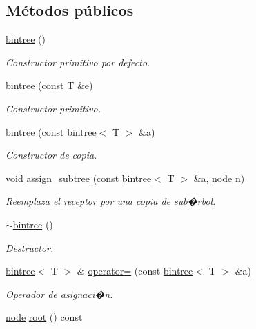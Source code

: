 \subsection*{Métodos públicos}
\begin{DoxyCompactItemize}
\item 
\hyperlink{classbintree_a9fed4a26a9c177dfa14a9cb573b43dca}{bintree} ()
\begin{DoxyCompactList}\small\item\em Constructor primitivo por defecto. \end{DoxyCompactList}\item 
\hyperlink{classbintree_a21aaa03b1510c5ffa52236d2a8973273}{bintree} (const T \&e)
\begin{DoxyCompactList}\small\item\em Constructor primitivo. \end{DoxyCompactList}\item 
\hyperlink{classbintree_a4658c6df869d8b35a72b6cbcf410bc5f}{bintree} (const \hyperlink{classbintree}{bintree}$<$ T $>$ \&a)
\begin{DoxyCompactList}\small\item\em Constructor de copia. \end{DoxyCompactList}\item 
void \hyperlink{classbintree_ab5fb2e54f418de017ba23a2b7084e67e}{assign\+\_\+subtree} (const \hyperlink{classbintree}{bintree}$<$ T $>$ \&a, \hyperlink{classbintree_1_1node}{node} n)
\begin{DoxyCompactList}\small\item\em Reemplaza el receptor por una copia de sub�rbol. \end{DoxyCompactList}\item 
\hyperlink{classbintree_a7f32fcbdc9aed453025a13cbe93e3b89}{$\sim$bintree} ()
\begin{DoxyCompactList}\small\item\em Destructor. \end{DoxyCompactList}\item 
\hyperlink{classbintree}{bintree}$<$ T $>$ \& \hyperlink{classbintree_a188622dd3846630d2f69b11a2eba3896}{operator=} (const \hyperlink{classbintree}{bintree}$<$ T $>$ \&a)
\begin{DoxyCompactList}\small\item\em Operador de asignaci�n. \end{DoxyCompactList}\item 
\hyperlink{classbintree_1_1node}{node} \hyperlink{classbintree_aa5d9c32204880ba5df3b31836d8720da}{root} () const 

\end{DoxyCompactItemize}
